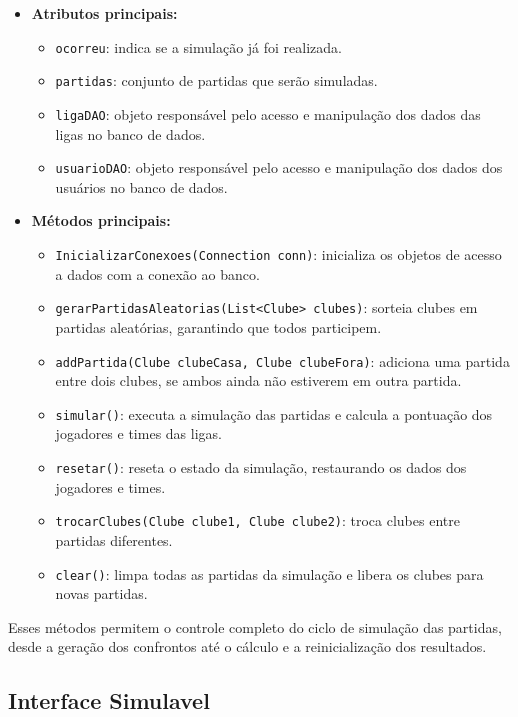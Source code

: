 \documentclass[12pt]{article}
\begin{document}
\begin{itemize}
  \item \textbf{Atributos principais:}
        \begin{itemize}
          \item \texttt{ocorreu}: indica se a simulação já foi realizada.
          \item \texttt{partidas}: conjunto de partidas que serão simuladas.
          \item \texttt{ligaDAO}: objeto responsável pelo acesso e manipulação dos dados das ligas no banco de dados.
          \item \texttt{usuarioDAO}: objeto responsável pelo acesso e manipulação dos dados dos usuários no banco de dados.
        \end{itemize}
  \item \textbf{Métodos principais:}
        \begin{itemize}
          \item \texttt{InicializarConexoes(Connection conn)}: inicializa os objetos de acesso a dados com a conexão ao banco.
          \item \texttt{gerarPartidasAleatorias(List<Clube> clubes)}: sorteia clubes em partidas aleatórias, garantindo que todos participem.
          \item \texttt{addPartida(Clube clubeCasa, Clube clubeFora)}: adiciona uma partida entre dois clubes, se ambos ainda não estiverem em outra partida.
          \item \texttt{simular()}: executa a simulação das partidas e calcula a pontuação dos jogadores e times das ligas.
          \item \texttt{resetar()}: reseta o estado da simulação, restaurando os dados dos jogadores e times.
          \item \texttt{trocarClubes(Clube clube1, Clube clube2)}: troca clubes entre partidas diferentes.
          \item \texttt{clear()}: limpa todas as partidas da simulação e libera os clubes para novas partidas.
        \end{itemize}
\end{itemize}

Esses métodos permitem o controle completo do ciclo de simulação das partidas, desde a geração dos confrontos até o cálculo e a reinicialização dos resultados.

\subsection{Interface Simulavel}
\end{document}
